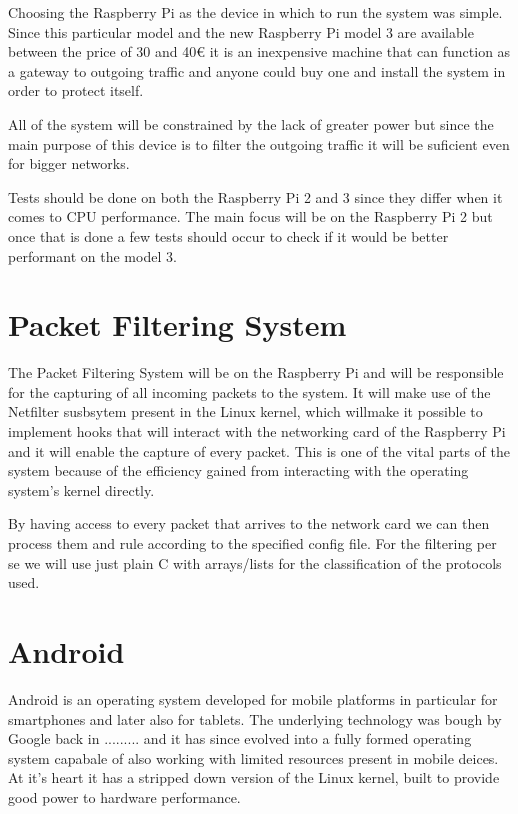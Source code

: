 Choosing the Raspberry Pi as the device in which to run the system was simple.
Since this particular model and the new Raspberry Pi model 3 are available
between the price of 30 and 40€ it is an inexpensive machine that can function
as a gateway to outgoing traffic and anyone could buy one and install the system
in order to protect itself.

All of the system will be constrained by the lack of greater power but since the
main purpose of this device is to filter the outgoing traffic it will be
suficient even for bigger networks.

Tests should be done on both the Raspberry Pi 2 and 3 since they differ when it
comes to CPU performance. The main focus will be on the Raspberry Pi 2 but once
that is done a few tests should occur to check if it would be better performant
on the model 3.

\section{Packet Filtering System}
\label{chap3:sec:pfs}
The Packet Filtering System will be on the Raspberry Pi and will be responsible
for the capturing of all incoming packets to the system. It will make use of
the Netfilter susbsytem present in the Linux kernel, which willmake it possible
to implement hooks that will interact with the networking card of the Raspberry
Pi and it will enable the capture of every packet. This is one of the vital
parts of the system because of the efficiency gained from interacting with the
operating system's kernel directly.

By having access to every packet that arrives to the network card we can then
process them and rule according to the specified config file. For the filtering
per se we will use just plain C with arrays/lists  for the classification of
the protocols used.

\section{Android}
\label{chap3:sec:andrd}
Android  is an operating system developed for mobile platforms in particular for
smartphones and later also for tablets. The underlying technology was bough by
Google back in ......... and it has since evolved into a fully formed operating
system capabale of also working with limited resources present in mobile deices.
At it's heart it has a stripped down version of the Linux kernel, built to
provide good power to hardware performance.

